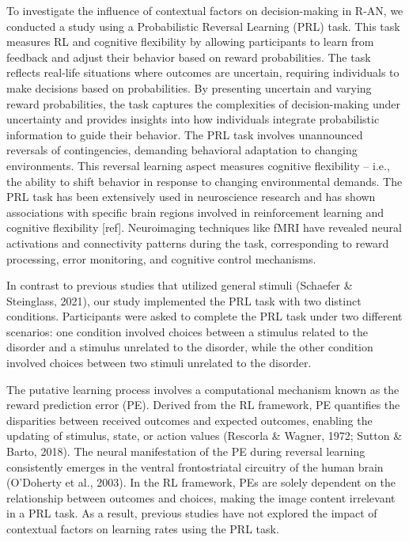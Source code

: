 \documentclass[
  man,floatsintext]{apa6}
\begin{document}
To investigate the influence of contextual factors on decision-making in R-AN, we conducted a study using a Probabilistic Reversal Learning (PRL) task. This task measures RL and cognitive flexibility by allowing participants to learn from feedback and adjust their behavior based on reward probabilities. The task reflects real-life situations where outcomes are uncertain, requiring individuals to make decisions based on probabilities. By presenting uncertain and varying reward probabilities, the task captures the complexities of decision-making under uncertainty and provides insights into how individuals integrate probabilistic information to guide their behavior. The PRL task involves unannounced reversals of contingencies, demanding behavioral adaptation to changing environments. This reversal learning aspect measures cognitive flexibility -- i.e., the ability to shift behavior in response to changing environmental demands. The PRL task has been extensively used in neuroscience research and has shown associations with specific brain regions involved in reinforcement learning and cognitive flexibility {[}ref{]}. Neuroimaging techniques like fMRI have revealed neural activations and connectivity patterns during the task, corresponding to reward processing, error monitoring, and cognitive control mechanisms.

In contrast to previous studies that utilized general stimuli (Schaefer \& Steinglass, 2021), our study implemented the PRL task with two distinct conditions. Participants were asked to complete the PRL task under two different scenarios: one condition involved choices between a stimulus related to the disorder and a stimulus unrelated to the disorder, while the other condition involved choices between two stimuli unrelated to the disorder.

The putative learning process involves a computational mechanism known as the reward prediction error (PE). Derived from the RL framework, PE quantifies the disparities between received outcomes and expected outcomes, enabling the updating of stimulus, state, or action values (Rescorla \& Wagner, 1972; Sutton \& Barto, 2018). The neural manifestation of the PE during reversal learning consistently emerges in the ventral frontostriatal circuitry of the human brain (O'Doherty et al., 2003). In the RL framework, PEs are solely dependent on the relationship between outcomes and choices, making the image content irrelevant in a PRL task. As a result, previous studies have not explored the impact of contextual factors on learning rates using the PRL task.
\end{document}
